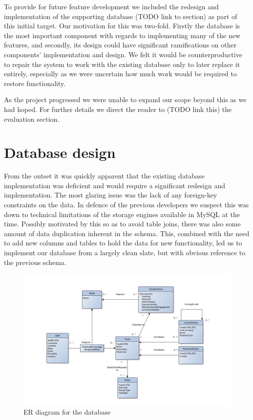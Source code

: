\documentclass[11pt, a4paper]{article}
\begin{document}
To provide for future feature development we included the redesign and implementation of the supporting database (TODO link to section) as part of this initial target. Our motivation for this was two-fold. Firstly the database is the most important component with regards to implementing many of the new features, and secondly, its design could have significant ramifications on other components’ implementation and design. We felt it would be counterproductive to repair the system to work with the existing database only to later replace it entirely, especially as we were uncertain how much work would be required to restore functionality.

As the project progressed we were unable to expand our scope beyond this as we had hoped. For further details we direct the reader to (TODO link this) the evaluation section.


\section{Database design}

From the outset it was quickly apparent that the existing database implementation was deficient and would require a significant redesign and implementation. The most glaring issue was the lack of any foreign-key constraints on the data. In defence of the previous developers we suspect this was down to technical limitations of the storage engines available in MySQL at the time. Possibly motivated by this so as to avoid table joins, there was also some amount of data duplication inherent in the schema. This, combined with the need to add new columns and tables to hold the data for new functionality, led us to implement our database from a largely clean slate, but with obvious reference to the previous schema.
\begin{landscape}
	\begin{figure}
	\thispagestyle{empty}
		\centering
		\includegraphics[scale=0.45]{DatabaseDiagram.png}
		\caption{ER diagram for the database}
	\end{figure}
\end{landscape}
\end{document}

